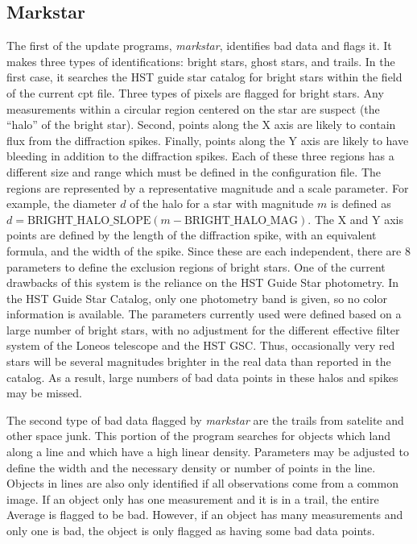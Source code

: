 \documentclass{article}
\newcommand\pr{\em}                   %
\newcommand\ty{\sc}                   %
\begin{document}
\subsection{Markstar}

The first of the update programs, {\pr markstar}, identifies bad data
and flags it.  It makes three types of identifications: bright stars,
ghost stars, and trails.  In the first case, it searches the HST guide
star catalog for bright stars within the field of the current {\ty cpt}
file.  Three types of pixels are flagged for bright stars.  Any
measurements within a circular region centered on the star are suspect
(the ``halo'' of the bright star).  Second, points along the X axis
are likely to contain flux from the diffraction spikes.  Finally,
points along the Y axis are likely to have bleeding in addition to the
diffraction spikes.  Each of these three regions has a different size
and range which must be defined in the configuration file.  The
regions are represented by a representative magnitude and a scale
parameter.  For example, the diameter $d$ of the halo for a star with
magnitude $m$ is defined as 
$d = \mbox{BRIGHT\_HALO\_SLOPE} (m - \mbox{BRIGHT\_HALO\_MAG})$.  The X and
Y axis points are defined by the length of the diffraction spike, with
an equivalent formula, and the width of the spike.  Since these are
each independent, there are 8 parameters to define the exclusion
regions of bright stars.  One of the current drawbacks of this system
is the reliance on the HST Guide Star photometry.  In the HST Guide
Star Catalog, only one photometry band is given, so no color
information is available.  The parameters currently used were defined
based on a large number of bright stars, with no adjustment for the
different effective filter system of the Loneos telescope and the HST
GSC.  Thus, occasionally very red stars will be several magnitudes
brighter in the real data than reported in the catalog.  As a result,
large numbers of bad data points in these halos and spikes may be
missed.  

The second type of bad data flagged by {\pr markstar} are the trails
from satelite and other space junk.  This portion of the program
searches for objects which land along a line and which have a high
linear density.  Parameters may be adjusted to define the width and
the necessary density or number of points in the line.  Objects in
lines are also only identified if all observations come from a common
image.  If an object only has one measurement and it is in a trail,
the entire Average is flagged to be bad.  However, if an object has
many measurements and only one is bad, the object is only flagged as
having some bad data points.  
\end{document}
